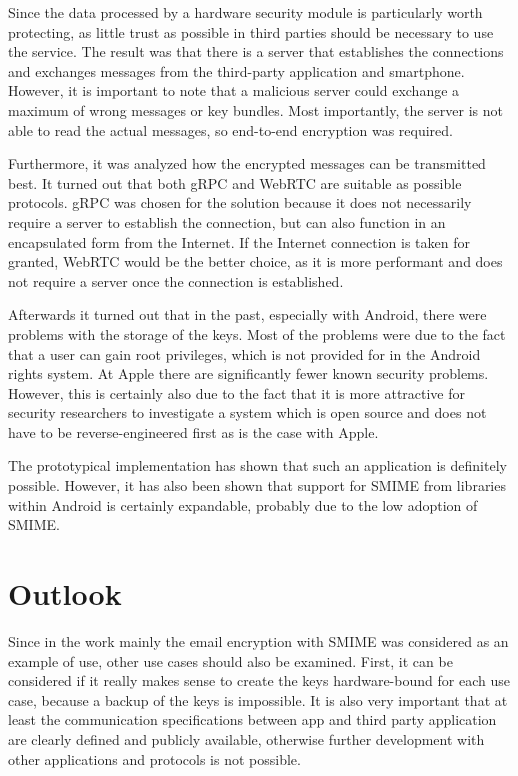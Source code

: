 \documentclass[12pt,oneside,a4paper,parskip]{scrbook}
\begin{document}
Since the data processed by a hardware security module is particularly worth protecting, as little trust as possible in third parties should be necessary to use the service. The result was that there is a server that establishes the connections and exchanges messages from the third-party application and smartphone. However, it is important to note that a malicious server could exchange a maximum of wrong messages or key bundles. Most importantly, the server is not able to read the actual messages, so end-to-end encryption was required. 

Furthermore, it was analyzed how the encrypted messages can be transmitted best. It turned out that both gRPC and WebRTC are suitable as possible protocols. gRPC was chosen for the solution because it does not necessarily require a server to establish the connection, but can also function in an encapsulated form from the Internet. If the Internet connection is taken for granted, WebRTC would be the better choice, as it is more performant and does not require a server once the connection is established. 

Afterwards it turned out that in the past, especially with Android, there were problems with the storage of the keys. Most of the problems were due to the fact that a user can gain root privileges, which is not provided for in the Android rights system. At Apple there are significantly fewer known security problems. However, this is certainly also due to the fact that it is more attractive for security researchers to investigate a system which is open source and does not have to be reverse-engineered first as is the case with Apple.

The prototypical implementation has shown that such an application is definitely possible. However, it has also been shown that support for SMIME from libraries within Android is certainly expandable, probably due to the low adoption of SMIME. 
\section{Outlook}
Since in the work mainly the email encryption with SMIME was considered as an example of use, other use cases should also be examined. First, it can be considered if it really makes sense to create the keys hardware-bound for each use case, because a backup of the keys is impossible. It is also very important that at least the communication specifications between app and third party application are clearly defined and publicly available, otherwise further development with other applications and protocols is not possible.
\end{document}
